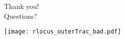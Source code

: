 \begin{frame}
\begin{center}
\Huge Thank you!\\
Questions?
\end{center}
\end{frame}

\begin{frame}
  \centering
  \texttt{[image: rlocus\_outerTrac\_bad.pdf]}
\end{frame}
